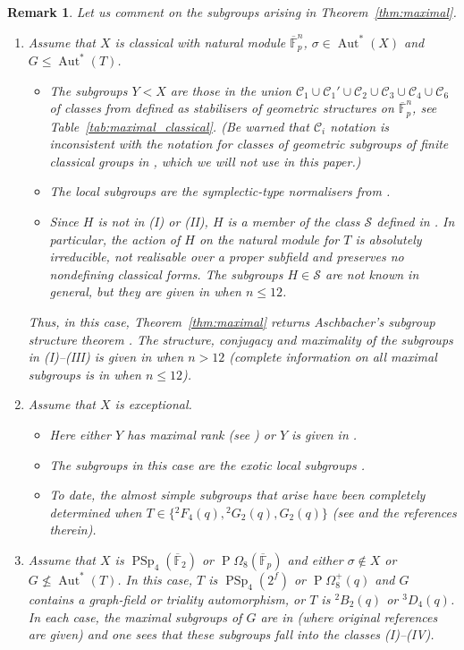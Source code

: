 \documentclass[11pt]{article}
\numberwithin{equation}{section}
\theoremstyle{shdefinition}
\newtheorem{remark}[definition]{Remark}
\theoremstyle{shplain}
\newcommand{\s}{\sigma}
\newcommand{\C}{\mathcal{C}}
\renewcommand{\S}{\mathcal{S}}
\newcommand{\<}{\langle}
\renewcommand{\>}{\rangle}
\renewcommand{\leq}{\leqslant}
\newcommand{\Aut}{\operatorname{Aut}}
\newcommand{\F}{\mathbb{F}}
\newcommand{\FF}{\overline{\F}}
\renewcommand{\:}{\colon}
\newcommand{\PSp}{\operatorname{PSp}}
\newcommand{\Om}{\Omega}
\newcommand{\POm}{\operatorname{P}\!\Om}
\begin{document}
\begin{remark} \label{rem:maximal}
Let us comment on the subgroups arising in Theorem~\ref{thm:maximal}.
\begin{enumerate}
\item Assume that $X$ is classical with natural module $\FF_p^n$, $\s \in \Aut^*(X)$ and $G \leq \Aut^*(T)$.
\begin{itemize}
\item[(I)]   The subgroups $Y < X$ are those in the union $\C_1 \cup \C_1' \cup \C_2 \cup \C_3 \cup \C_4 \cup \C_6$ of classes from \cite{ref:LiebeckSeitz98} defined as stabilisers of geometric structures on $\FF_p^n$, see Table~\ref{tab:maximal_classical}. (Be warned that $\C_i$ notation is inconsistent with the notation for classes of geometric subgroups of \emph{finite} classical groups in \cite{ref:KleidmanLiebeck}, which we will not use in this paper.)
\item[(III)] The local subgroups are the symplectic-type normalisers from \cite[Section~4.6]{ref:KleidmanLiebeck}.
\item[(IV)]  Since $H$ is not in (I) or (II), $H$ is a member of the class $\S$ defined in \cite[p.3]{ref:KleidmanLiebeck}. In particular, the action of $H$ on the natural module for $T$ is absolutely irreducible, not realisable over a proper subfield and preserves no nondefining classical forms. The subgroups $H \in \S$ are not known in general, but they are given in \cite{ref:BrayHoltRoneyDougal} when $n \leq 12$.
\end{itemize}
Thus, in this case, Theorem~\ref{thm:maximal} returns Aschbacher's subgroup structure theorem \cite{ref:Aschbacher84}. The structure, conjugacy and maximality of the subgroups in (I)--(III) is given in \cite{ref:KleidmanLiebeck} when $n > 12$ (complete information on all maximal subgroups is in \cite{ref:BrayHoltRoneyDougal} when $n \leq 12$).
\item Assume that $X$ is exceptional. 
\begin{itemize}
\item[(I)]   Here either $Y$ has maximal rank (see \cite{ref:LiebeckSaxlSeitz92}) or $Y$ is given in \cite[Table~II]{ref:LiebeckSeitz90}.
\item[(III)] The subgroups in this case are the exotic local subgroups \cite{ref:CohenLiebeckSaxlSeitz92}.
\item[(IV)]  To date, the almost simple subgroups that arise have been completely determined when $T \in \{ {}^2F_4(q), {}^2G_2(q), G_2(q) \}$ (see \cite{ref:BrayHoltRoneyDougal} and the references therein).
\end{itemize}
\item Assume that $X$ is $\PSp_4(\FF_2)$ or $\POm_8(\FF_p)$ and either $\s \not\in X$ or $G \not\leq \Aut^*(T)$. In this case, $T$ is $\PSp_4(2^f)$ or $\POm^+_8(q)$ and $G$ contains a graph-field or triality automorphism, or $T$ is ${}^2B_2(q)$ or ${}^3D_4(q)$. In each case, the maximal subgroups of $G$ are in \cite{ref:BrayHoltRoneyDougal} (where original references are given) and one sees that these subgroups fall into the classes (I)--(IV).
\end{enumerate}
\end{remark}
\end{document}
